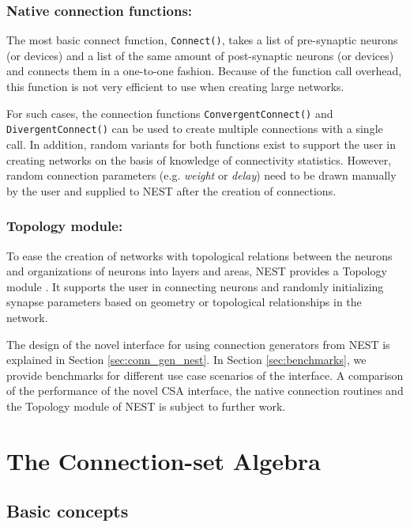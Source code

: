 \documentclass{frontiersSCNS} %
\begin{document}
\subsubsection*{Native connection functions:}

The most basic connect function, \verb|Connect()|, takes a list of
pre-synaptic neurons (or devices) and a list of the same amount of
post-synaptic neurons (or devices) and connects them in a one-to-one
fashion. Because of the function call overhead, this function is not
very efficient to use when creating large networks.

For such cases, the connection functions \verb|ConvergentConnect()|
and \verb|DivergentConnect()| can be used to create multiple
connections with a single call. In addition, random variants for both
functions exist to support the user in creating networks on the basis
of knowledge of connectivity statistics. However, random connection
parameters (e.g. \emph{weight} or \emph{delay}) need to be drawn
manually by the user and supplied to NEST after the creation of
connections.

\subsubsection*{Topology module:}

To ease the creation of networks with topological relations between
the neurons and organizations of neurons into layers and areas, NEST
provides a Topology module \citep{Plesser_13}. It supports the user in
connecting neurons and randomly initializing synapse parameters based
on geometry or topological relationships in the network.

The design of the novel interface for using connection generators from
NEST is explained in Section \ref{sec:conn_gen_nest}. In Section
\ref{sec:benchmarks}, we provide benchmarks for different use case
scenarios of the interface. A comparison of the performance of the
novel CSA interface, the native connection routines and the Topology
module of NEST is subject to further work.


\section{The Connection-set Algebra}\label{sec:csa}

\subsection{Basic concepts}
\end{document}

